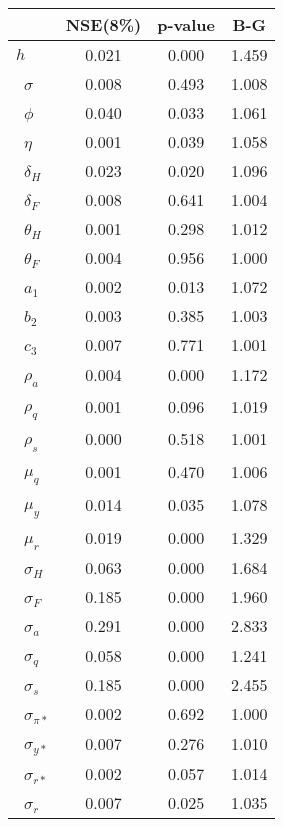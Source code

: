 \begin{tiny}\begin{tabular}{lccc}
\hline
&\textbf{NSE(8\%)}&\textbf{p-value}&\textbf{B-G}\\\hline
\textbf{$ h             $}&0.021&0.000&1.459\\\
\textbf{$ \sigma        $}&0.008&0.493&1.008\\\
\textbf{$ \phi          $}&0.040&0.033&1.061\\\
\textbf{$ \eta          $}&0.001&0.039&1.058\\\
\textbf{$ \delta_{H}    $}&0.023&0.020&1.096\\\
\textbf{$ \delta_{F}    $}&0.008&0.641&1.004\\\
\textbf{$ \theta_{H}    $}&0.001&0.298&1.012\\\
\textbf{$ \theta_{F}    $}&0.004&0.956&1.000\\\
\textbf{$ a_{1}         $}&0.002&0.013&1.072\\\
\textbf{$ b_{2}         $}&0.003&0.385&1.003\\\
\textbf{$ c_{3}         $}&0.007&0.771&1.001\\\
\textbf{$ \rho_{a}      $}&0.004&0.000&1.172\\\
\textbf{$ \rho_{q}      $}&0.001&0.096&1.019\\\
\textbf{$ \rho_{s}      $}&0.000&0.518&1.001\\\
\textbf{$ \mu_{q}       $}&0.001&0.470&1.006\\\
\textbf{$ \mu_{y}       $}&0.014&0.035&1.078\\\
\textbf{$ \mu_{r}       $}&0.019&0.000&1.329\\\
\textbf{$ \sigma_{H}    $}&0.063&0.000&1.684\\\
\textbf{$ \sigma_{F}    $}&0.185&0.000&1.960\\\
\textbf{$ \sigma_{a}    $}&0.291&0.000&2.833\\\
\textbf{$ \sigma_{q}    $}&0.058&0.000&1.241\\\
\textbf{$ \sigma_{s}    $}&0.185&0.000&2.455\\\
\textbf{$ \sigma_{\pi*} $}&0.002&0.692&1.000\\\
\textbf{$ \sigma_{y*}   $}&0.007&0.276&1.010\\\
\textbf{$ \sigma_{r*}   $}&0.002&0.057&1.014\\\
\textbf{$ \sigma_{r}    $}&0.007&0.025&1.035\\\hline
\end{tabular}
\end{tiny}